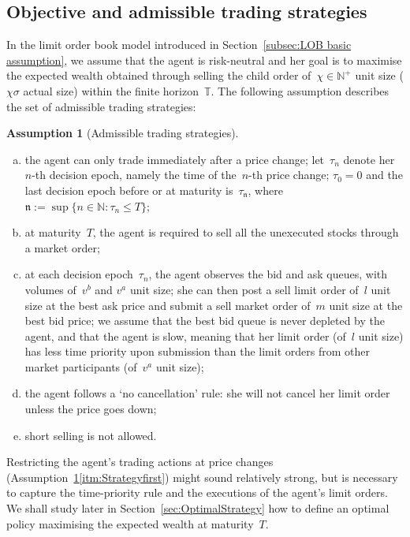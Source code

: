 \documentclass{amsart}[11pt]
\numberwithin{equation}{section}
\theoremstyle{definition}
\newtheorem{assumption}[theorem]{Assumption}
\newcommand{\NN}{\mathbb{N}}
\newcommand{\TT}{\mathbb{T}}
\newcommand{\nn}{\mathfrak{n}}
\begin{document}
\subsection{Objective and admissible trading strategies}\label{subsec:strategyassum}
In the limit order book model introduced in Section~\ref{subsec:LOB basic assumption},
we assume that the agent is risk-neutral and her goal is to maximise the expected wealth obtained through selling the child order of~$\chi\in\NN^+$ unit size ($\chi\sigma$ actual size) within the finite horizon~$\TT$.
The following assumption describes the set of admissible trading strategies:
\begin{assumption}[Admissible trading strategies]\label{ass:AdmissibleTradingS}\ 
\begin{enumerate}[(a)]
\item \label{itm:Strategyfirst}
the agent can only trade immediately after a price change;
let~$\tau_n$ denote her~$n$-th decision epoch, 
namely the time of the~$n$-th price change; 
$\tau_0 = 0$ and the last decision epoch before or at maturity is~$\tau_{\nn}$, 
where~$\nn:=\sup\{n\in\NN: \tau_n\leq T\}$;
\item \label{itm:Strategyfirst'}
at maturity~$T$,
the agent is required to sell all the unexecuted stocks through a market order;
\item \label{itm:Strategysecond}
at each decision epoch~$\tau_n$, the agent observes the bid and ask queues,
with volumes of~$v^b$ and $v^a$ unit size;
she can then post a sell limit order of~$l$ unit size at the best ask price
and submit a sell market order of~$m$ unit size at the best bid price;
we assume that the best bid queue is never depleted by the agent,
and that the agent is slow, meaning that her limit order (of~$l$ unit size) has less time priority upon submission than the limit orders from other market participants (of~$v^a$ unit size);
\item \label{itm:Strategythird}
the agent follows a `no cancellation' rule:
she will not cancel her limit order unless the price goes down;
\item \label{itm:Strategyfourth}
short selling is not allowed.
\end{enumerate}
\end{assumption}
Restricting the agent's trading actions at price changes 
(Assumption~\ref{ass:AdmissibleTradingS}\eqref{itm:Strategyfirst}) might sound relatively strong,
but is necessary to capture the time-priority rule and the executions of the agent's limit orders. 
We shall study later in Section~\ref{sec:OptimalStrategy} how to define an optimal policy
maximising the expected wealth at maturity~$T$. 
\end{document}
